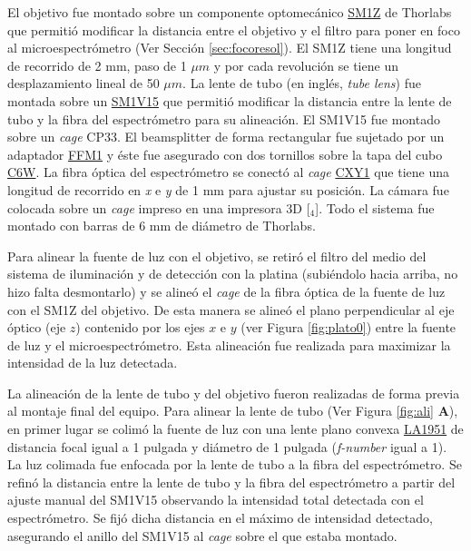 El objetivo fue montado sobre un componente optomecánico \href{https://www.thorlabs.com/thorProduct.cfm?partNumber=SM1Z\#ad-image-0}{SM1Z} de Thorlabs que permitió modificar la distancia entre el objetivo y el filtro para poner en foco al microespectrómetro (Ver Sección \ref{sec:focoresol}). El SM1Z tiene una longitud de recorrido de 2 mm, paso de 1 $\mu m$ y por cada revolución se tiene un desplazamiento lineal de 50 $\mu m$.  La lente de tubo (en inglés, \textit{tube lens}) fue montada sobre un \href{https://www.thorlabs.com/thorproduct.cfm?partnumber=SM1V15}{SM1V15} que permitió modificar la distancia entre la lente de tubo y la fibra del espectrómetro para su alineación. El SM1V15 fue montado sobre un \textit{cage} CP33. El beamsplitter de forma rectangular fue sujetado por un adaptador \href{https://www.thorlabs.com/thorproduct.cfm?partnumber=FFM1\#ad-image-0}{FFM1} y éste fue asegurado con dos tornillos sobre la tapa del cubo \href{https://www.thorlabs.com/thorproduct.cfm?partnumber=C6W}{C6W}. La fibra óptica del espectrómetro se conectó al \textit{cage} \href{https://www.thorlabs.com/thorproduct.cfm?partnumber=CXY1\#ad-image-0}{CXY1} que tiene una longitud de recorrido en \textit{x} e \textit{y} de 1 mm para ajustar su posición. La cámara fue colocada sobre un \textit{cage} impreso en una impresora 3D [\href{https://github.com/jrr1984/open_frame_XYStage/blob/master/3dprintedparts/STLs/CAGE\_1pulgada.STL}{\faCubes$_{4}$}]. Todo el sistema fue montado con barras de 6 mm de diámetro de Thorlabs.

Para alinear la fuente de luz con el objetivo, se retiró el filtro del medio del sistema de iluminación y de detección con la platina (subiéndolo hacia arriba, no hizo falta desmontarlo) y se alineó el \textit{cage} de la fibra óptica de la fuente de luz con el SM1Z del objetivo. De esta manera se alineó el plano perpendicular al eje óptico (eje $\textit{z}$) contenido por los ejes $\textit{x}$ e $\textit{y}$ (ver Figura \ref{fig:plato0}) entre la fuente de luz y el microespectrómetro. Esta alineación fue realizada para maximizar la intensidad de la luz detectada.

La alineación de la lente de tubo y del objetivo fueron realizadas de forma previa al montaje final del equipo. Para alinear la lente de tubo (Ver Figura \ref{fig:ali} \textbf{A}), en primer lugar se colimó la fuente de luz con una lente plano convexa \href{https://www.thorlabs.com/thorproduct.cfm?partnumber=LA1951}{LA1951} de distancia focal igual a 1 pulgada y diámetro de 1 pulgada (\textit{f-number} igual a 1). La luz colimada fue enfocada por la lente de tubo a la fibra del espectrómetro. Se refinó la distancia entre la lente de tubo y la fibra del espectrómetro a partir del ajuste manual del SM1V15 observando la intensidad total detectada con el espectrómetro. Se fijó dicha distancia en el máximo de intensidad detectado, asegurando el anillo del SM1V15 al \textit{cage} sobre el que estaba montado.

